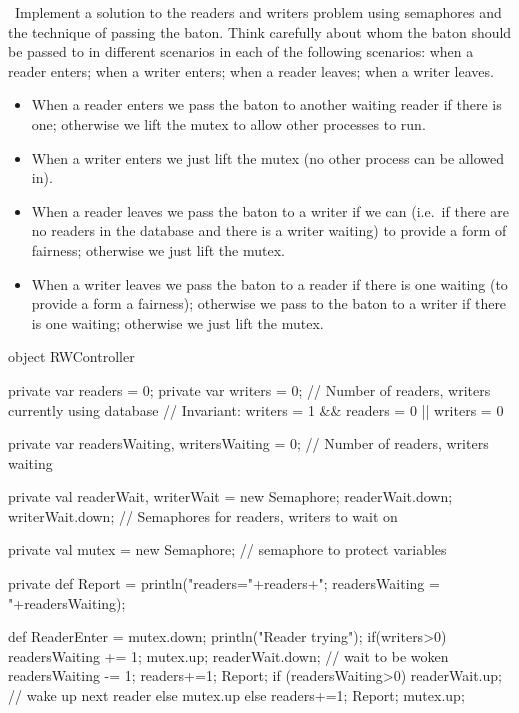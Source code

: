 \begin{question}
\Programming\ Implement a solution to the readers and writers problem using
semaphores and the technique of passing the baton.  Think carefully about whom
the baton should be passed to in different scenarios in each of the following
scenarios: when a reader enters; when a writer enters; when a reader leaves;
when a writer leaves.
\end{question}


\begin{answer}
\begin{itemize}
\item When a reader enters we pass the baton to another waiting reader if
  there is one; otherwise we lift the mutex to allow other processes to run.

\item When a writer enters we just lift the mutex (no other process can be
  allowed in).

\item When a reader leaves we pass the baton to a writer if we can (i.e.~if
  there are no readers in the database and there is a writer waiting) to
  provide a form of fairness; otherwise we just lift the mutex.

\item When a writer leaves we pass the baton to a reader if there is one
  waiting (to provide a form a fairness); otherwise we pass to the baton to a
  writer if there is one waiting; otherwise we just lift the mutex.
\end{itemize}

\begin{scala}
object RWController{
  private var readers = 0; private var writers = 0;
  // Number of readers, writers currently using database
  // Invariant: writers = 1 && readers = 0 || writers = 0

  private var readersWaiting, writersWaiting = 0;
  // Number of readers, writers waiting

  private val readerWait, writerWait = new Semaphore;
  readerWait.down; writerWait.down;
  // Semaphores for readers, writers to wait on

  private val mutex = new Semaphore; // semaphore to protect variables

  private def Report = { 
    println("readers="+readers+"; readersWaiting = "+readersWaiting); 
  }
    
  def ReaderEnter = {
    mutex.down; println("Reader trying");
    if(writers>0){ 
      readersWaiting += 1; mutex.up; 
      readerWait.down; // wait to be woken
      readersWaiting -= 1; readers+=1; Report; 
      if (readersWaiting>0) readerWait.up; // wake up next reader
      else mutex.up
    }
    else{ readers+=1; Report; mutex.up; }
  }

}
\end{scala}
\end{answer}

